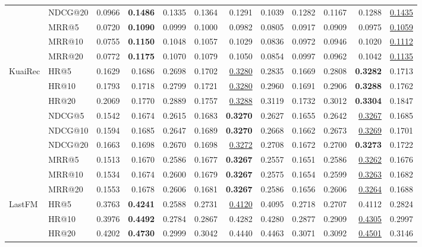 \begin{tabular}{llrrrrrrrrrr}
 & NDCG@20 & 0.0966 & \textbf{0.1486} & 0.1335 & 0.1364 & 0.1291 & 0.1039 & 0.1282 & 0.1167 & 0.1288 & \underline{0.1435} \\
 & MRR@5 & 0.0720 & \textbf{0.1090} & 0.0999 & 0.1000 & 0.0982 & 0.0805 & 0.0917 & 0.0909 & 0.0975 & \underline{0.1059} \\
 & MRR@10 & 0.0755 & \textbf{0.1150} & 0.1048 & 0.1057 & 0.1029 & 0.0836 & 0.0972 & 0.0946 & 0.1020 & \underline{0.1112} \\
 & MRR@20 & 0.0772 & \textbf{0.1175} & 0.1070 & 0.1079 & 0.1050 & 0.0854 & 0.0997 & 0.0962 & 0.1042 & \underline{0.1135} \\
\hline
KuaiRec & HR@5 & 0.1629 & 0.1686 & 0.2698 & 0.1702 & \underline{0.3280} & 0.2835 & 0.1669 & 0.2808 & \textbf{0.3282} & 0.1713 \\
 & HR@10 & 0.1793 & 0.1718 & 0.2799 & 0.1721 & \underline{0.3280} & 0.2960 & 0.1691 & 0.2906 & \textbf{0.3288} & 0.1762 \\
 & HR@20 & 0.2069 & 0.1770 & 0.2889 & 0.1757 & \underline{0.3288} & 0.3119 & 0.1732 & 0.3012 & \textbf{0.3304} & 0.1847 \\
 & NDCG@5 & 0.1542 & 0.1674 & 0.2615 & 0.1683 & \textbf{0.3270} & 0.2627 & 0.1655 & 0.2642 & \underline{0.3267} & 0.1685 \\
 & NDCG@10 & 0.1594 & 0.1685 & 0.2647 & 0.1689 & \textbf{0.3270} & 0.2668 & 0.1662 & 0.2673 & \underline{0.3269} & 0.1701 \\
 & NDCG@20 & 0.1663 & 0.1698 & 0.2670 & 0.1698 & \underline{0.3272} & 0.2708 & 0.1672 & 0.2700 & \textbf{0.3273} & 0.1722 \\
 & MRR@5 & 0.1513 & 0.1670 & 0.2586 & 0.1677 & \textbf{0.3267} & 0.2557 & 0.1651 & 0.2586 & \underline{0.3262} & 0.1676 \\
 & MRR@10 & 0.1534 & 0.1674 & 0.2600 & 0.1679 & \textbf{0.3267} & 0.2575 & 0.1654 & 0.2599 & \underline{0.3263} & 0.1682 \\
 & MRR@20 & 0.1553 & 0.1678 & 0.2606 & 0.1681 & \textbf{0.3267} & 0.2586 & 0.1656 & 0.2606 & \underline{0.3264} & 0.1688 \\
\hline
LastFM & HR@5 & 0.3763 & \textbf{0.4241} & 0.2588 & 0.2731 & \underline{0.4120} & 0.4095 & 0.2718 & 0.2707 & 0.4112 & 0.2824 \\
 & HR@10 & 0.3976 & \textbf{0.4492} & 0.2784 & 0.2867 & 0.4282 & 0.4280 & 0.2877 & 0.2909 & \underline{0.4305} & 0.2997 \\
 & HR@20 & 0.4202 & \textbf{0.4730} & 0.2999 & 0.3042 & 0.4440 & 0.4463 & 0.3071 & 0.3092 & \underline{0.4501} & 0.3146 \\

\end{tabular}
